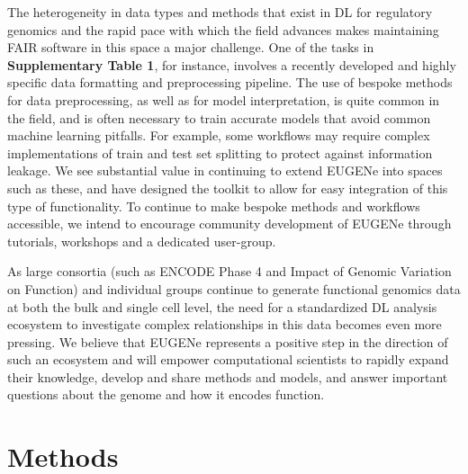 The heterogeneity in data types and methods that exist in DL for regulatory genomics and the rapid pace with which the field advances makes maintaining FAIR software in this space a major challenge. One of the tasks in \textbf{Supplementary Table 1}, for instance, involves a recently developed and highly specific data formatting and preprocessing pipeline\cite{Bravo_Gonzalez-Blas2019-fq}. The use of bespoke methods for data preprocessing, as well as for model interpretation, is quite common in the field, and is often necessary to train accurate models that avoid common machine learning pitfalls\cite{Whalen2021-fh}. For example, some workflows may require complex implementations of train and test set splitting to protect against information leakage\cite{Urban2020-ij}. We see substantial value in continuing to extend EUGENe into spaces such as these, and have designed the toolkit to allow for easy integration of this type of functionality. To continue to make bespoke methods and workflows accessible, we intend to encourage community development of EUGENe through tutorials, workshops and a dedicated user-group.

As large consortia (such as ENCODE Phase 4 and Impact of Genomic Variation on Function) and individual groups continue to generate functional genomics data at both the bulk and single cell level, the need for a standardized DL analysis ecosystem to investigate complex relationships in this data becomes even more pressing. We believe that EUGENe represents a positive step in the direction of such an ecosystem and will empower computational scientists to rapidly expand their knowledge, develop and share methods and models, and answer important questions about the genome and how it encodes function.


\section{Methods}

